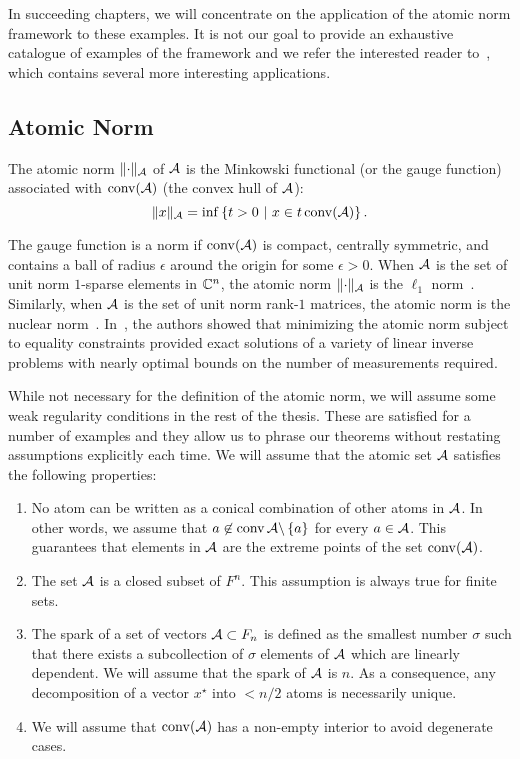 In succeeding chapters, we will concentrate on the application of the atomic
norm framework to these examples. It is not our goal to provide an exhaustive
catalogue of examples of the framework and we refer the interested reader
to~\cite{crpw}, which contains several more interesting applications.

\subsection{Atomic Norm}

\begin{definition}
The atomic norm $\lVert\cdot\rVert_{\mathcal{A}}$ of $\mathcal{A}$ is the Minkowski functional (or the
gauge function) associated with $\operatorname{conv}(\mathcal{A})$ (the convex hull of $\mathcal{A}$):
\begin{equation}
	\label{defatnorm} \lVert x\rVert_{\mathcal{A}} = \inf\left\{t > 0 ~\middle|~ x \in t \operatorname{conv}(\mathcal{A}) \right\}. 
\end{equation}
\end{definition}

The gauge function is a norm if $\operatorname{conv}(\mathcal{A})$ is compact, centrally symmetric, and
contains a ball of radius $\epsilon$ around the origin for some $\epsilon>0$.
When $\mathcal{A}$ is the set of unit norm $1$-sparse elements in $\mathbb{C}^n$, the atomic norm
$\lVert\cdot\rVert_{\mathcal{A}}$ is the $\ell_1$ norm~\cite{candes06}. Similarly, when $\mathcal{A}$ is
the set of unit norm rank-$1$ matrices, the atomic norm is the nuclear
norm~\cite{Recht10}. In~\cite{crpw}, the authors showed that minimizing the
atomic norm subject to equality constraints provided exact solutions of a
variety of linear inverse problems with nearly optimal bounds on the number of
measurements required.

While not necessary for the definition of the atomic norm, we will assume some
weak regularity conditions in the rest of the thesis. These are satisfied for a
number of examples and they allow us to phrase our theorems without restating
assumptions explicitly each time. We will assume that the atomic set $\mathcal{A}$ satisfies the following properties:
\begin{enumerate}
	\item No atom can be written as a conical combination of other atoms in 		$\mathcal{A}$. In other words, we assume that $ a \not\in \operatorname{conv}{\mathcal{A} \backslash \left\{ a \right\}}$ for every $a \in \mathcal{A}$. This guarantees that elements in $\mathcal{A}$ are the extreme points of the set $\operatorname{conv}(\mathcal{A})$.
	\item The set $\mathcal{A}$ is a closed subset of $F^n$. This assumption is always true for finite sets.
	\item The spark of a set of vectors $\mathcal{A} \subset F_n$ is defined as the smallest number $\sigma$ such that there exists a subcollection of $\sigma$ elements of $\mathcal{A}$ which are linearly dependent. We will assume that the spark of $\mathcal{A}$ is $n$. As a consequence, any decomposition of a vector $x^\star$ into $<n/2$ atoms is necessarily unique.~\cite{spark}
	\item We will assume that $\operatorname{conv}(\mathcal{A})$ has a non-empty interior to avoid degenerate cases.
\end{enumerate}


